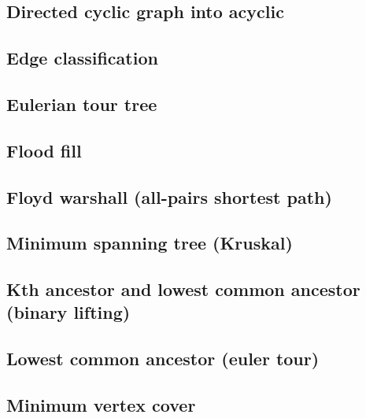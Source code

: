 \subsection{Directed cyclic graph into acyclic}
\raggedbottom
\hrulefill
\subsection{Edge classification}
\raggedbottom
\hrulefill
\subsection{Eulerian tour tree}
\raggedbottom
\hrulefill
\subsection{Flood fill}
\raggedbottom
\hrulefill
\subsection{Floyd warshall (all-pairs shortest path)}
\raggedbottom
\hrulefill
\subsection{Minimum spanning tree (Kruskal)}
\raggedbottom
\hrulefill
\subsection{Kth ancestor and lowest common ancestor (binary lifting)}
\raggedbottom
\hrulefill
\subsection{Lowest common ancestor (euler tour)}
\raggedbottom
\hrulefill
\subsection{Minimum vertex cover}
\raggedbottom
\hrulefill
